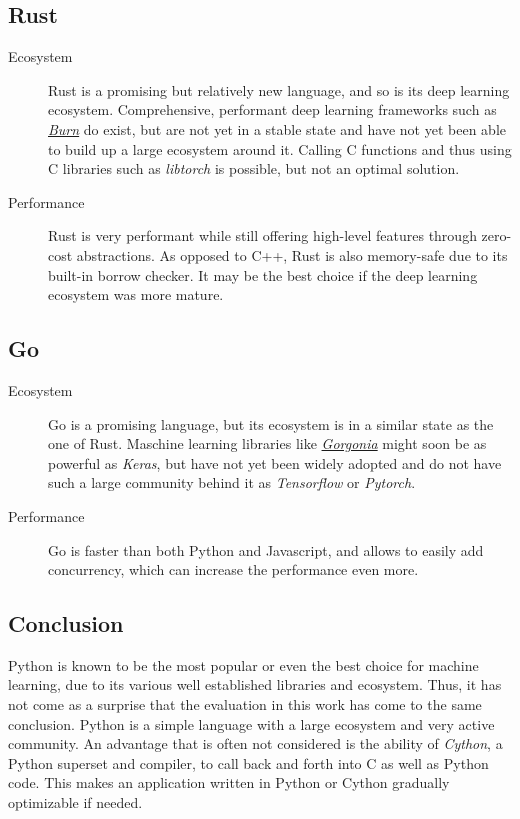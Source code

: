 \documentclass[12pt, a4paper, titlepage]{report}
\let\oldhref\href
\renewcommand{\href}[2]{\oldhref{#1}{\itshape#2}}
\begin{document}
{
   \center
   \subsection*{Rust}
}
\begin{description}
   \item[Ecosystem] Rust is a promising but relatively new language, and so is its deep learning ecosystem. Comprehensive, performant deep learning frameworks such as \href{https://github.com/Tracel-AI/burn}{Burn} do exist, but are not yet in a stable state and have not yet been able to build up a large ecosystem around it. Calling C functions and thus using C libraries such as \emph{libtorch} is possible, but not an optimal solution.
   \item[Performance] Rust is very performant while still offering high-level features through zero-cost abstractions. As opposed to C++, Rust is also memory-safe due to its built-in borrow checker. It may be the best choice if the deep learning ecosystem was more mature.
\end{description}

{
   \center
   \subsection*{Go}
}
\begin{description}
   \item[Ecosystem] Go is a promising language, but its ecosystem is in a similar state as the one of Rust. Maschine learning libraries like \href{https://github.com/Tracel-AI/gorgonia}{Gorgonia} might soon be as powerful as \emph{Keras}, but have not yet been widely adopted and do not have such a large community behind it as \emph{Tensorflow} or \emph{Pytorch}.
   \item[Performance] Go is faster than both Python and Javascript, and allows to easily add concurrency, which can increase the performance even more.
\end{description}


\subsection{Conclusion}

Python is known to be the most popular or even the best choice for machine learning, due to its various well established libraries and ecosystem. Thus, it has not come as a surprise that the evaluation in this work has come to the same conclusion. Python is a simple language with a large ecosystem and very active community. An advantage that is often not considered is the ability of \emph{Cython}, a Python superset and compiler, to call back and forth into C as well as Python code. This makes an application written in Python or Cython gradually optimizable if needed.
\end{document}
